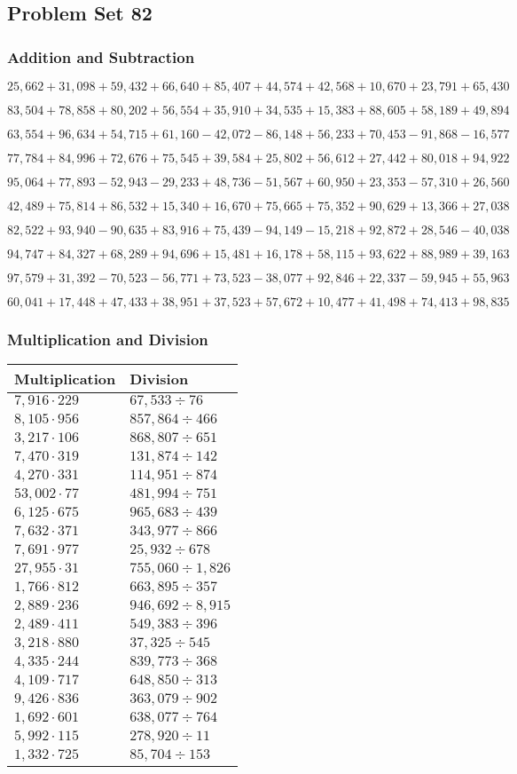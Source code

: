 \hypertarget{problem-set-82}{%
\subsection{Problem Set 82}\label{problem-set-82}}

\hypertarget{addition-and-subtraction-304}{%
\subsubsection{Addition and
Subtraction}\label{addition-and-subtraction-304}}

\(25,662+31,098+59,432+66,640+85,407+44,574+42,568+10,670+23,791+ 65,430\)

\(83,504+78,858+80,202+56,554+35,910+34,535+15,383+88,605+58,189+49,894\)

\(63,554+96,634+54,715+61,160-42,072-86,148+56,233+70,453-91,868-16,577\)

\(77,784+84,996+72,676+75,545+39,584+25,802+56,612+27,442+80,018+94,922\)

\(95,064+77,893-52,943-29,233+48,736-51,567+60,950+23,353-57,310+26,560\)

\(42,489+75,814+86,532+15,340+16,670+75,665+75,352+90,629+13,366+27,038\)

\(82,522+93,940-90,635+83,916+75,439-94,149-15,218+92,872+28,546-40,038\)

\(94,747+84,327+68,289+94,696+15,481+16,178+58,115+93,622+88,989+39,163\)

\(97,579+31,392-70,523-56,771+73,523-38,077+92,846+22,337-59,945+55,963\)

\(60,041+17,448+47,433+38,951+37,523+57,672+10,477+41,498+74,413+98,835\)

\hypertarget{multiplication-and-division-303}{%
\subsubsection{Multiplication and
Division}\label{multiplication-and-division-303}}

\begin{longtable}[]{@{}ll@{}}
\toprule
Multiplication & Division\tabularnewline
\midrule
\endhead
\(7,916\cdot229\) & \(67,533÷76\)\tabularnewline
\(8,105\cdot956\) & \(857,864÷466\)\tabularnewline
\(3,217\cdot106\) & \(868,807÷651\)\tabularnewline
\(7,470\cdot319\) & \(131,874÷142\)\tabularnewline
\(4,270\cdot331\) & \(114,951÷874\)\tabularnewline
\(53,002\cdot77\) & \(481,994÷751\)\tabularnewline
\(6,125\cdot675\) & \(965,683÷439\)\tabularnewline
\(7,632\cdot371\) & \(343,977÷866\)\tabularnewline
\(7,691\cdot977\) & \(25,932÷678\)\tabularnewline
\(27,955\cdot31\) & \(755,060÷1,826\)\tabularnewline
\(1,766\cdot812\) & \(663,895÷357\)\tabularnewline
\(2,889\cdot236\) & \(946,692÷8,915\)\tabularnewline
\(2,489\cdot411\) & \(549,383÷396\)\tabularnewline
\(3,218\cdot880\) & \(37,325÷545\)\tabularnewline
\(4,335\cdot244\) & \(839,773÷368\)\tabularnewline
\(4,109\cdot717\) & \(648,850÷313\)\tabularnewline
\(9,426\cdot836\) & \(363,079÷902\)\tabularnewline
\(1,692\cdot601\) & \(638,077÷764\)\tabularnewline
\(5,992\cdot115\) & \(278,920÷11\)\tabularnewline
\(1,332\cdot725\) & \(85,704÷153\)\tabularnewline
\bottomrule
\end{longtable}

